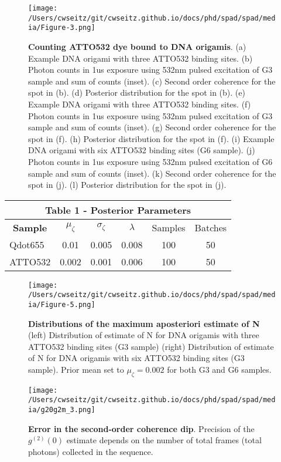 \begin{figure}[t]
\centering
\texttt{[image: /Users/cwseitz/git/cwseitz.github.io/docs/phd/spad/spad/media/Figure-3.png]}
\caption{\textbf{Counting ATTO532 dye bound to DNA origamis}. (a) Example DNA origami with three ATTO532 binding sites. (b) Photon counts in 1us exposure using 532nm pulsed excitation of G3 sample and sum of counts (inset). (c) Second order coherence for the spot in (b). (d) Posterior distribution for the spot in (b). (e) Example DNA origami with three ATTO532 binding sites. (f) Photon counts in 1us exposure using 532nm pulsed excitation of G3 sample and sum of counts (inset). (g) Second order coherence for the spot in (f). (h) Posterior distribution for the spot in (f). (i) Example DNA origami with six ATTO532 binding sites (G6 sample). (j) Photon counts in 1us exposure using 532nm pulsed excitation of G6 sample and sum of counts (inset). (k) Second order coherence for the spot in (j). (l) Posterior distribution for the spot in (j).}
\label{fig:atto}
\end{figure}  

\begin{table}[]
\centering
\begin{tabular}{lccccc}
\multicolumn{6}{c}{\textbf{Table 1 - Posterior Parameters}} \\ \hline
\multicolumn{1}{c}{\textbf{Sample}}  & $\mu_{\zeta}$ & $\sigma_{\zeta}$ & $\lambda$ & Samples & Batches \\
Qdot655 & 0.01 & 0.005 & 0.008 & 100 & 50 \\
ATTO532 & 0.002 & 0.001 & 0.006 & 100 & 50 \\
\end{tabular}
\end{table}

\begin{figure}[t]
\centering
\texttt{[image: /Users/cwseitz/git/cwseitz.github.io/docs/phd/spad/spad/media/Figure-5.png]}
\caption{\textbf{Distributions of the maximum aposteriori estimate of N} (left) Distribution of estimate of N for DNA origamis with three ATTO532 binding sites (G3 sample) (right) Distribution of estimate of N for DNA origamis with six ATTO532 binding sites (G3 sample). Prior mean set to $\mu_\zeta=0.002$ for both G3 and G6 samples.}
\label{fig:atto}
\end{figure}  



\begin{figure}[t]
\centering
\texttt{[image: /Users/cwseitz/git/cwseitz.github.io/docs/phd/spad/spad/media/g20g2m\_3.png]}
\caption{\textbf{Error in the second-order coherence dip}. Precision of the $g^{(2)}(0)$ estimate depends on the number of total frames (total photons) collected in the sequence. }
\label{fig:atto}
\end{figure}  


